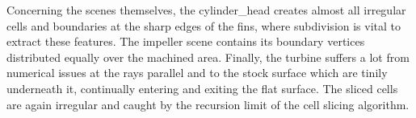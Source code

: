 Concerning the scenes themselves, the cylinder\_head creates almost all irregular cells and boundaries at the sharp edges of the fins, where subdivision is vital to extract these features.
The impeller scene contains its boundary vertices distributed equally over the machined area.
Finally, the turbine suffers a lot from numerical issues at the rays parallel and to the stock surface which are tinily underneath it, continually entering and exiting the flat surface.
The sliced cells are again irregular and caught by the recursion limit of the cell slicing algorithm.
